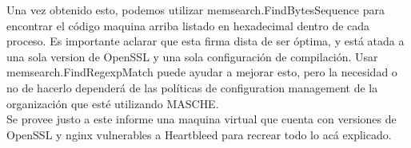 Una vez obtenido esto, podemos utilizar memsearch.FindBytesSequence para
encontrar el código maquina arriba listado en hexadecimal dentro de cada
proceso. Es importante aclarar que esta firma dista de ser óptima, y está atada
a una sola version de OpenSSL y una sola configuración de compilación. Usar
memsearch.FindRegexpMatch puede ayudar a mejorar esto, pero la necesidad o no
de hacerlo dependerá de las políticas de configuration management de la
organización que esté utilizando MASCHE.\\

Se provee justo a este informe una maquina virtual que cuenta con versiones de
OpenSSL y nginx vulnerables a Heartbleed para recrear todo lo acá explicado.\\

